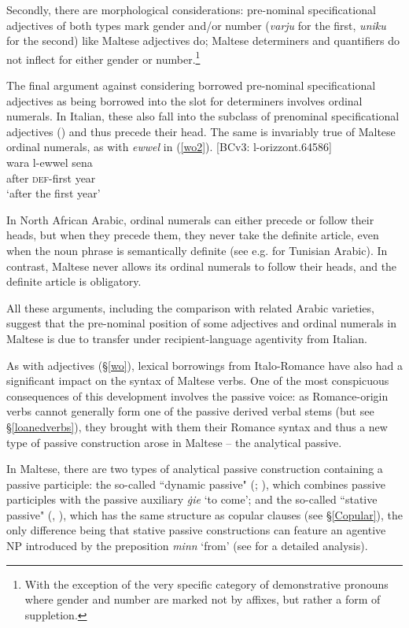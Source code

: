 \documentclass[output=paper]{langsci/langscibook}
\begin{document}
Secondly, there are morphological considerations: pre-nominal specificational adjectives of both types mark gender and/or number (\textit{varju} for the first, \textit{uniku} for the second) like Maltese adjectives do; Maltese determiners and quantifiers do not inflect for either gender or number.\footnote{With the exception of the very specific category of demonstrative pronouns where gender and number are marked not by affixes, but rather a form of suppletion.}

The final argument against considering borrowed pre-nominal specificational adjectives as being borrowed into the slot for determiners involves ordinal numerals. In Italian, these also fall into the subclass of prenominal specificational adjectives (\citealt[55]{italian2007}) and thus precede their head. The same is invariably true of Maltese ordinal numerals, as with \textit{ewwel} in (\ref{wo2}).
\ea\label{wo2} 
	{[BCv3: l-orizzont.64586]}\\
	\gll wara l-ewwel sena\\
	after \textsc{def}-first year\\
	\glt `after the first year'\\
\z

In North African Arabic, ordinal numerals can either precede or follow their heads, but when they precede them, they never take the definite article, even when the noun phrase is semantically definite (see e.g. \citealt[284]{Ritt-Benmimoun2014} for Tunisian Arabic). In contrast, Maltese never allows its ordinal numerals to follow their heads, and the definite article is obligatory.

All these arguments, including the comparison with related Arabic varieties, suggest that the pre-nominal position of some adjectives and ordinal numerals in Maltese is due to transfer under recipient-language agentivity from Italian.

As with adjectives (§\ref{wo}), lexical borrowings from Italo-Romance have also had a significant impact on the syntax of Maltese verbs. One of the most conspicuous consequences of this development involves the passive voice: as Romance-origin verbs cannot generally form one of the passive derived verbal stems (but see §\ref{loanedverbs}), they brought with them their Romance syntax and thus a new type of passive construction arose in Maltese -- the analytical passive.

In Maltese, there are two types of analytical passive construction containing a passive participle: the so-called ``dynamic passive" (\citealt[321--324]{Vanhove1993}; \citealt[214]{BorgAzzopardi-Alexander1997}), which combines passive participles with the passive auxiliary \textit{ġie} `to come'; and the so-called ``stative passive" (\citealt[214]{BorgAzzopardi-Alexander1997}, \citealt[318--320]{Vanhove1993}), which has the same structure as copular clauses (see §\ref{Copular}), the only difference being that stative passive constructions can feature an agentive NP introduced by the preposition \textit{minn} `from' (see \citealt[104--107]{bulbul2018} for a detailed analysis).
\end{document}
